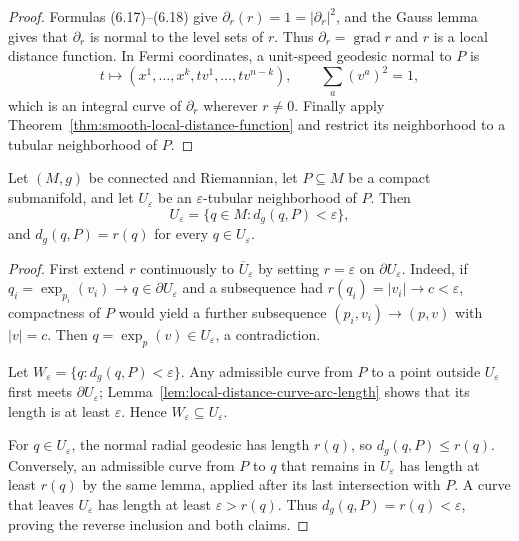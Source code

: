 \begin{proof}
\sketch Formulas (6.17)--(6.18) give
$\partial_r(r)=1=|\partial_r|^2$, and the Gauss lemma gives that
$\partial_r$ is normal to the level sets of $r$. Thus
$\partial_r=\operatorname{grad}r$ and $r$ is a local distance function.
In Fermi coordinates, a unit-speed geodesic normal to $P$ is
\[
t\longmapsto(x^1,\ldots,x^k,tv^1,\ldots,tv^{n-k}),
\qquad \sum_a(v^a)^2=1,
\]
which is an integral curve of $\partial_r$ wherever $r\neq0$. Finally apply
Theorem~\ref{thm:smooth-local-distance-function} and restrict its neighborhood
to a tubular neighborhood of $P$.
\end{proof}

\begin{theorem}
\label{thm:tubular-neighborhood-metric-distance}


Let $(M,g)$ be connected and Riemannian, let $P\subseteq M$ be a compact
submanifold, and let $U_\varepsilon$ be an $\varepsilon$-tubular neighborhood
of $P$. Then
\[
U_\varepsilon=\{q\in M:d_g(q,P)<\varepsilon\},
\]
and $d_g(q,P)=r(q)$ for every $q\in U_\varepsilon$.
\end{theorem}

\begin{proof}
\sketch First extend $r$ continuously to $\overline U_\varepsilon$ by setting
$r=\varepsilon$ on $\partial U_\varepsilon$. Indeed, if
$q_i=\exp_{p_i}(v_i)\to q\in\partial U_\varepsilon$ and a subsequence had
$r(q_i)=|v_i|\to c<\varepsilon$, compactness of $P$ would yield a further
subsequence $(p_i,v_i)\to(p,v)$ with $|v|=c$. Then
$q=\exp_p(v)\in U_\varepsilon$, a contradiction.

Let $W_\varepsilon=\{q:d_g(q,P)<\varepsilon\}$. Any admissible curve from
$P$ to a point outside $U_\varepsilon$ first meets
$\partial U_\varepsilon$; Lemma~\ref{lem:local-distance-curve-arc-length}
shows that its length is at least $\varepsilon$. Hence
$W_\varepsilon\subseteq U_\varepsilon$.

For $q\in U_\varepsilon$, the normal radial geodesic has length $r(q)$, so
$d_g(q,P)\leq r(q)$. Conversely, an admissible curve from $P$ to $q$ that
remains in $U_\varepsilon$ has length at least $r(q)$ by the same lemma,
applied after its last intersection with $P$. A curve that leaves
$U_\varepsilon$ has length at least $\varepsilon>r(q)$. Thus
$d_g(q,P)=r(q)<\varepsilon$, proving the reverse inclusion and both claims.
\end{proof}

